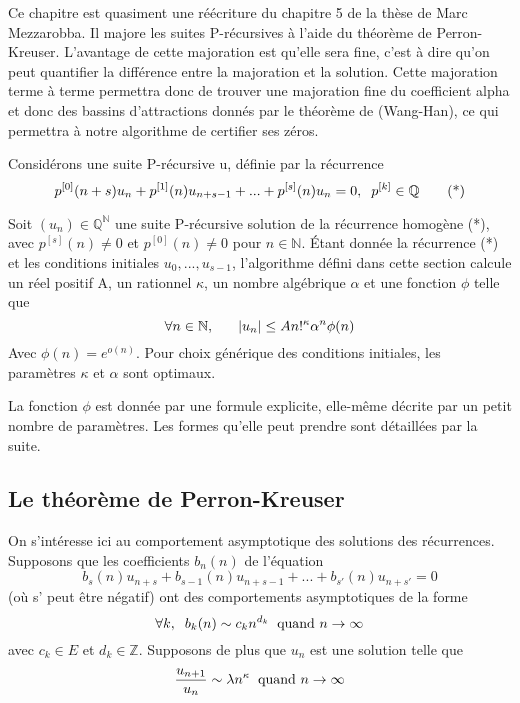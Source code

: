 \documentclass[a4paper,10.5pt]{article}
\begin{document}
	Ce chapitre est quasiment une réécriture du chapitre 5 de la thèse de Marc Mezzarobba. Il majore les suites P-récursives à l'aide du théorème de Perron-Kreuser.
	L'avantage de cette majoration est qu'elle sera fine, c'est à dire qu'on peut quantifier la différence entre la majoration et la solution.
	Cette majoration terme à terme permettra donc de trouver une majoration fine du coefficient alpha et donc des bassins d'attractions donnés par le théorème de (Wang-Han), ce qui permettra à notre algorithme de certifier ses zéros.
	
	Considérons une suite P-récursive u, définie par la récurrence
	\[p^{[0]}(n+s)u_{n}+p^{[1]}(n)u_{n+s-1}+...+p^{[s]}(n)u_{n}=0,\hspace{2mm} p^{[k]}\in \mathbb{Q} \tag{*}\] 
	\begin{theorem}Soit $(u_{n})\in \mathbb{Q}^{\mathbb{N}}$ une suite P-récursive solution de la récurrence homogène (*), avec $p^{[s]}(n) \neq 0$ et $p^{[0]}(n) \neq 0$ pour $n \in \mathbb{N}$. Étant donnée la récurrence (*) et les conditions initiales $u_{0},...,u_{s-1}$, l'algorithme défini dans cette section calcule un réel positif A, un rationnel $\kappa$, un nombre algébrique $\alpha$  et une fonction $\phi$ telle que
		\[\forall n\in \mathbb{N}, \hspace{6mm}|u_{n}| \leq A n!^{\kappa}\alpha^{n}\phi(n)\]
		Avec $\phi(n)=e^{o(n)}$. Pour choix générique des conditions initiales, les paramètres $\kappa$ et $\alpha$ sont optimaux.
	\end{theorem}
	
	La fonction $\phi$ est donnée par une formule explicite, elle-même décrite par un petit nombre de paramètres. Les formes qu'elle peut prendre sont détaillées par la suite.
	
	\subsection{Le théorème de Perron-Kreuser}
	
	On s'intéresse ici au comportement asymptotique des solutions des récurrences. Supposons que les coefficients $b_{n}(n)$ de l'équation
	\[b_{s}(n)u_{n+s}+b_{s-1}(n)u_{n+s-1}+...+b_{s'}(n)u_{n+s'}=0  \tag{*}\]
	(où s' peut être négatif) ont des comportements asymptotiques de la forme
	\[\forall k, \hspace{2mm} b_{k}(n) \sim c_{k}n^{d_{k}} \hspace{2mm} \text{quand } n \rightarrow \infty\]
	avec $c_{k} \in E$ et $d_{k} \in \mathbb{Z}$. Supposons de plus que $u_{n}$ est une solution telle que  
	\[\frac{u_{n+1}}{u_{n}}\sim \lambda n^{\kappa} \hspace{2mm} \text{quand }n \rightarrow \infty\]
	
\end{document}
